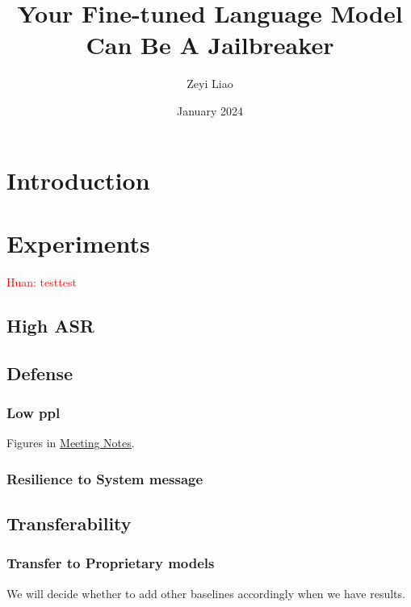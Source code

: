 \documentclass{article}
\title{Your Fine-tuned Language Model Can Be A Jailbreaker}
\author{Zeyi Liao}
\date{January 2024}
\newcommand{\huan}[1]{\textcolor{red}{Huan: #1}}
\begin{document}
\maketitle

\section{Introduction}
\section{Experiments}
\huan{testtest}
\subsection{High ASR}


\subsection{Defense}
\subsubsection{Low ppl}
Figures in \href{https://docs.google.com/document/d/1uvpDLHIPFsrZBQyb86uZjaKjL7RhBJ187pzkmnuiK1M/edit#heading=h.8lk5okrbken9}{Meeting Notes}.



\subsubsection{Resilience to System message}


\subsection{Transferability}
\subsubsection{Transfer to Proprietary models}
We will decide whether to add other baselines accordingly when we have results.

\end{document}
